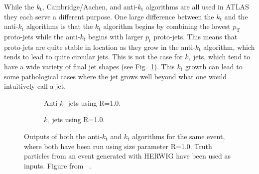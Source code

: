 While the $k_{\mathrm{t}}$, Cambridge/Aachen, and anti-$k_{\mathrm t}$ algorithms are all used in ATLAS they each serve a different purpose. 
One large difference between the $k_{\mathrm t}$ and the anti-$k_{\mathrm t}$ algorithms is that the $k_{\mathrm t}$ algorithm begins by combining the lowest $p_{\mathrm T}$ proto-jets while the anti-$k_{\mathrm t}$ begins with larger $p_{\mathrm t}$ proto-jets.  
This means that proto-jets are quite stable in location as they grow in the anti-$k_{\mathrm t}$ algorithm, which tends to lead to quite circular jets.  
This is not the case for $k_{\mathrm t}$ jets, which tend to have a wide variety of final jet shapes (see Fig.~\ref{Fig:ExampleJets}).  
This $k_{\mathrm t}$ growth can lead to some pathological cases where the jet grows well beyond what one would intuitively call a jet.  

\begin{figure}[!ht]
 \centering
 \begin{subfigure}{.5\textwidth}
  \centering
  \caption{Anti-$k_{\mathrm t}$ jets using R=1.0.}
 \end{subfigure}%
 \begin{subfigure}{.5\textwidth}
  \centering
  \caption{$k_{\mathrm t}$ jets using R=1.0.}
 \end{subfigure}
 \caption[Comparing differnet jet building algorithms.]
  {Outputs of both the anti-$k_{\mathrm t}$ and $k_{\mathrm t}$ algorithms for the same event, where both have been run using size parameter R=1.0.  Truth particles from an event generated with HERWIG have been used as inputs.  Figure from ~\cite{Cacciari:2008gp}. }

 \label{Fig:ExampleJets}
\end{figure}



